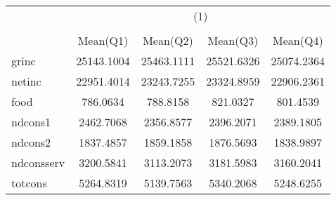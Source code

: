 {
\begin{center}
\def\sym#1{\ifmmode^{#1}\else\(^{#1}\)\fi}
\begin{tabular}{l*{1}{cccc}}
\hline
            &\multicolumn{4}{c}{(1)}                            \\
            &\multicolumn{4}{c}{}                               \\
            &    Mean(Q1)&    Mean(Q2)&    Mean(Q3)&    Mean(Q4)\\
\hline
grinc       &  25143.1004&  25463.1111&  25521.6326&  25074.2364\\
netinc      &  22951.4014&  23243.7255&  23324.8959&  22906.2361\\
food        &    786.0634&    788.8158&    821.0327&    801.4539\\
ndcons1     &   2462.7068&   2356.8577&   2396.2071&   2389.1805\\
ndcons2     &   1837.4857&   1859.1858&   1876.5693&   1838.9897\\
ndconsserv  &   3200.5841&   3113.2073&   3181.5983&   3160.2041\\
totcons     &   5264.8319&   5139.7563&   5340.2068&   5248.6255\\
\hline\hline
\end{tabular}
\end{center}
}
